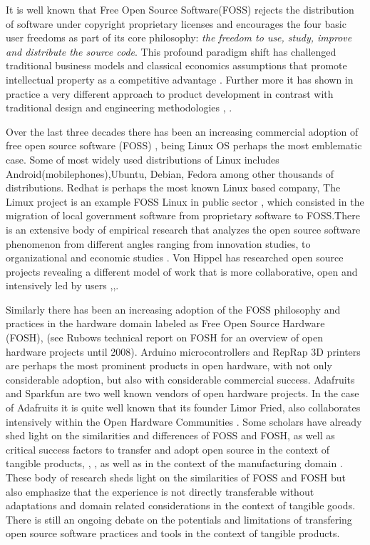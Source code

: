 \documentclass{ICED-Paper}%
\begin{document}
It is well known that Free Open Source Software(FOSS) rejects the distribution of software under copyright proprietary licenses and encourages the four basic user freedoms as part of its core philosophy\cite{Freedoms}: \emph{the freedom to use, study, improve and distribute the source code}. This profound paradigm shift has challenged traditional business models and classical economics assumptions that promote intellectual property as a competitive advantage \cite{Para_shift}. Further more it has shown in practice a very different approach to product development in contrast with traditional design and engineering methodologies \cite{HowItWorks}, \cite{bazaar}.
\bigskip

Over the last three decades there has been an increasing commercial adoption of free open source software (FOSS) \cite{Adoption}, being Linux OS perhaps the most emblematic case. Some of most widely used distributions of Linux includes Android(mobilephones),Ubuntu, Debian, Fedora among other thousands of distributions\cite{}. Redhat is perhaps the most known Linux based company,  The Limux project is an example FOSS Linux in public sector \cite{Limux}, which consisted in the migration of local government software from proprietary software to FOSS.There is an extensive body of empirical research that analyzes the open source software phenomenon from different angles ranging from innovation studies\cite{HowItWorks}, to organizational \cite{ActivityTheoryOpenSource} and economic studies \cite{Economics}. Von Hippel has researched open source projects revealing a different model of work that is more collaborative, open and intensively led by users \cite{HowItWorks},\cite{hippel_4},\cite{hippel_2}.
\bigskip

Similarly there has been an increasing adoption of the FOSS philosophy and practices in the hardware domain labeled as Free Open Source Hardware (FOSH)\cite{FH}, \cite{what_OH} (see Rubows technical report on FOSH \cite{Rubow} for an overview of open hardware projects until 2008). Arduino microcontrollers and RepRap 3D printers are perhaps the most prominent products in open hardware, with not only considerable adoption, but also with considerable commercial success. Adafruits and Sparkfun are two well known vendors of open hardware projects. In the case of Adafruits it is quite well known that its founder Limor Fried, also collaborates intensively within the Open Hardware Communities \cite{Million_Dollar}. Some scholars have already shed light on the similarities and differences of FOSS and FOSH, as well as critical success factors to transfer and adopt open source in the context of tangible products, \cite{OSTangible}, \cite{OSTangibleGoods}, as well as in the context of the manufacturing domain \cite{digitalCommons}. These body of research sheds light on the similarities of FOSS and FOSH but also emphasize that the experience is not directly transferable without adaptations and domain related considerations in the context of tangible goods. There is still an ongoing debate on the potentials and limitations of transfering open source software practices and tools in the context of tangible products.
\bigskip
\end{document}
